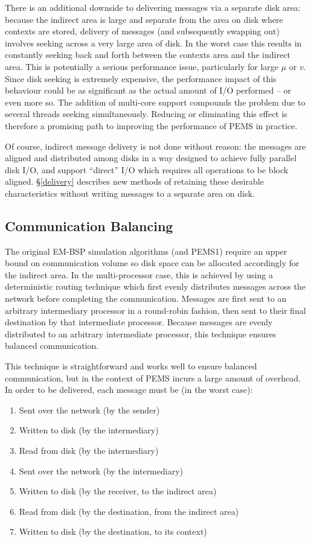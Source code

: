 \documentclass[12pt]{carletoncsthesis}
\begin{document}
There is an additional downside to delivering messages via a separate disk
area: because the indirect area is large and separate from the area on disk
where contexts are stored, delivery of messages (and subsequently swapping
out) involves seeking across a very large area of disk.  In the worst case
this results in constantly seeking back and forth between the contexts area
and the indirect area.  This is potentially a serious performance issue,
particularly for large $\mu$ or $v$.  Since disk seeking is extremely
expensive, the performance impact of this behaviour could be as significant
as the actual amount of I/O performed -- or even more so.  The addition
of multi-core support compounds the problem due to several threads seeking
simultaneously.  Reducing or eliminating this effect is therefore a promising
path to improving the performance of PEMS in practice.

Of course, indirect message delivery is not done without reason: the messages
are aligned and distributed among disks in a way designed to achieve fully
parallel disk I/O, and support ``direct'' I/O which requires all operations to
be block aligned.  \S\ref{delivery} describes new methods of retaining these
desirable characteristics without writing messages to a separate area on disk.

\subsection{Communication Balancing}
\label{pems1-balancing}


The original EM-BSP simulation algorithms (and PEMS1) require an upper
bound on communication volume so disk space can be allocated accordingly
for the indirect area.  In the multi-processor case, this is achieved by
using a deterministic routing technique \cite{balancing} which first evenly
distributes messages across the network before completing the communication.
Messages are first sent to an arbitrary intermediary processor in a round-robin
fashion, then sent to their final destination by that intermediate processor.
Because messages are evenly distributed to an arbitrary intermediate processor,
this technique ensures balanced communication.

This technique is straightforward and works well to ensure balanced
communication, but in the context of PEMS incurs a large amount of overhead.
In order to be delivered, each message must be (in the worst case):
\begin{enumerate}
\item Sent over the network (by the sender)
\item Written to disk (by the intermediary)
\item Read from disk (by the intermediary)
\item Sent over the network (by the intermediary)
\item Written to disk (by the receiver, to the indirect area)
\item Read from disk (by the destination, from the indirect area)
\item Written to disk (by the destination, to its context)
\end{enumerate}
\end{document}
